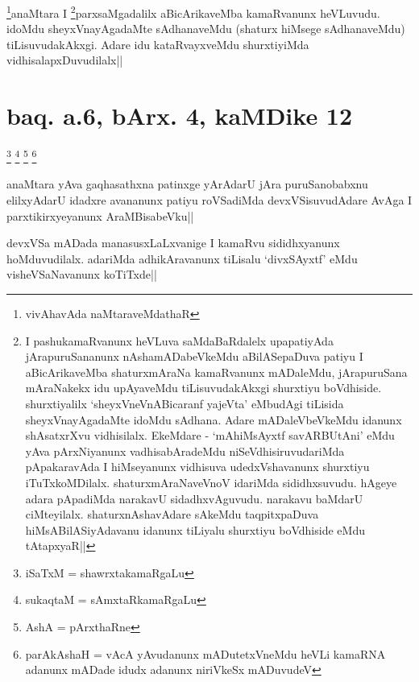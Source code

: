\begin{artha}
\footnote[1]{vivAhavAda naMtaraveMdathaR}anaMtara I \footnote[2]{I 
pashukamaRvanunx heVLuva saMdaBaRdalelx upapatiyAda jArapuruSananunx 
nAshamADabeVkeMdu aBilASepaDuva patiyu I aBicArikaveMba shaturxmAraNa 
kamaRvanunx mADaleMdu, jArapuruSana mAraNakekx idu upAyaveMdu 
tiLisuvudakAkxgi shurxtiyu boVdhiside. shurxtiyalilx 
`sheyxVneVnABicaranf yajeVta' eMbudAgi tiLisida sheyxVnayAgadaMte 
idoMdu sAdhana. Adare mADaleVbeVkeMdu idanunx shAsatxrXvu vidhisilalx. 
EkeMdare - `mAhiMsAyxtf savARBUtAni' eMdu yAva pArxNiyanunx 
vadhisabAradeMdu niSeVdhisiruvudariMda pApakaravAda I hiMseyanunx 
vidhisuva udedxVshavanunx shurxtiyu iTuTxkoMDilalx. 
shaturxmAraNaveVnoV idariMda sididhxsuvudu. hAgeye adara pApadiMda 
narakavU sidadhxvAguvudu. narakavu baMdarU ciMteyilalx. 
shaturxnAshavAdare sAkeMdu taqpitxpaDuva hiMsABilASiyAdavanu idanunx 
tiLiyalu shurxtiyu boVdhiside eMdu tAtapxyaR||}parxsaMgadalilx aBicArikaveMba 
kamaRvanunx heVLuvudu. idoMdu sheyxVnayAgadaMte sAdhanaveMdu (shaturx 
hiMsege sAdhanaveMdu) tiLisuvudakAkxgi. Adare idu kataRvayxveMdu 
shurxtiyiMda vidhisalapxDuvudilalx||
\end{artha}

\section*{baq. a.6, bArx. 4, kaMDike 12}

\stext\footnote[1]{iSaTxM = shawrxtakamaRgaLu} \footnote[2]{sukaqtaM = 
sAmxtaRkamaRgaLu} \footnote[3]{AshA = pArxthaRne} 
\footnote[4]{parAkAshaH = vAcA yAvudanunx mADutetxVneMdu heVLi kamaRNA 
adanunx mADade idudx adanunx niriVkeSx mADuvudeV}


\begin{artha}
anaMtara yAva gaqhasathxna patinxge yArAdarU jAra puruSanobabxnu 
elilxyAdarU idadxre avananunx patiyu roVSadiMda devxVSisuvudAdare 
AvAga I parxtikirxyeyanunx AraMBisabeVku||
\end{artha}


\begin{artha}
devxVSa mADada manasusxLaLxvanige I kamaRvu sididhxyanunx 
hoMduvudilalx. adariMda adhikAravanunx tiLisalu `divxSAyxtf' eMdu 
visheVSaNavanunx koTiTxde||
\end{artha}


